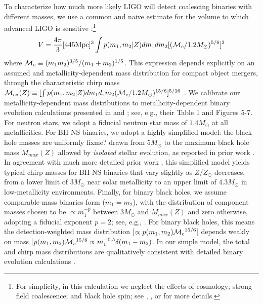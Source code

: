 \documentclass[nofootinbib,twocolumn,prd]{emulateapj}
\newcommand\mc{{\cal M}_c{}}
\newcommand\editremark[1]{{\color{red}#1}}
\newcommand\unit[1]{\text{#1}}
\begin{document}
\begin{widetext}
To characterize how much more likely LIGO will detect coalescing binaries with different masses, we use a common and
naive estimate for the volume to which advanced LIGO is sensitive \citep[see,e.g.,][]{PSellipticals}:\footnote{For
  simplicity, in this calculation we neglect the effects of cosmology; strong field coalescence; and black hole spin;
  see \cite{popsyn-LowMetallicityImpact2c-StarTrackRevised-2014}, \cite{AstroPaper}, or \cite{RatesPaper} for more details.}
\begin{eqnarray}
V = \frac{4\pi}{3} [445 \unit{Mpc}]^3 \int p(m_1,m_2|Z) dm_1 dm_2 [ (\mc/1.2 M_\odot)^{5/6}]^3
\end{eqnarray}
where $\mc\equiv (m_1 m_2)^{3/5}/(m_1+m_2)^{1/5}$.   
This expression depends explicitly on an assumed and metallicity-dependent mass distribution for compact object
mergers, through the characteristic chirp mass $\mc_{*}(Z)\equiv [\int p(m_1,m_2|Z) dm_1 d,m_2 (\mc/1.2
  M_\odot)^{15/6}]^{5/16}$ .  We calibrate our metallicity-dependent mass distributions to metallicity-dependent binary
evolution calculations presented in \cite{popsyn-LowMetallicityImpact2-StarTrackRevised-2012} and
\cite{popsyn-LowMetallicityImpact2c-StarTrackRevised-2014}; see, e.g., their Table 1 and Figures 5-7.    For neutron
stars, we adopt a fiducial neutron star mass of $1.4 M_\odot$ at all metallicities.  For BH-NS binaries, we adopt a
highly simplified model: the black hole masses are uniformly \editremark{fixme?} drawn from $5 M_\odot$ to the maximum 
black hole mass $M_{max}(Z)$ allowed by
\emph{isolated} stellar evolution, as reported in prior work \citep[see,e.g.][and references
  therein]{gwastro-EventPopsynPaper-2016}.  In agreement with much more detailed prior work \cite{popsyn-LowMetallicityImpact2c-StarTrackRevised-2014}, this simplified model yields typical chirp masses for BH-NS binaries that
vary slightly as $Z/Z_\odot$ decreases, from a lower limit of $3 M_\odot$ near solar metallicity to an upper limit of
$4.3 M_\odot$ in low-metallicity environments.  Finally, for binary black holes, we assume  comparable-mass binaries
form ($m_1=m_2$), with the distribution of component masses chosen to be $\propto m_1^{-p}$ 
 between $3 M_\odot$ and $M_{max}(Z)$ and zero otherwise, adopting a fiducial exponent $p=2$; see, e.g.,
\cite{popsyn-LowMetallicityImpact2b-StarTrackRevised-2013}.    For binary black holes, this means  the
detection-weighted mass distribution [$\propto p(m_1,m_2)
\mc^{15/6}$] depends weakly on mass [$ p(m_1,m_2)
\mc^{15/6} \propto m_1^{-0.5} \delta(m_1-m_2)$.  In our simple model, the total  and chirp mass
distributions   are qualitatively consistent with detailed  binary evolution calculations \citep{popsyn-LowMetallicityImpact2b-StarTrackRevised-2013}. 

\end{widetext}
\end{document}
